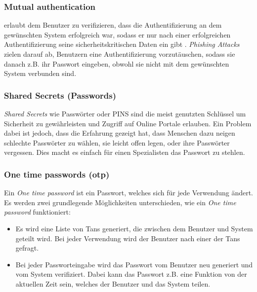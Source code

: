 \subsubsection{Mutual authentication}
erlaubt dem Benutzer zu verifizieren, dass die Authentifizierung an dem gewünschten System erfolgreich war, sodass er nur nach einer erfolgreichen Authentifizierung seine sicherheitskritischen Daten ein gibt . \textit{Phishing Attacks} zielen darauf ab, Benutzern eine Authentifizierung  vorzutäuschen, sodass sie danach z.B. ihr Passwort eingeben, obwohl sie nicht mit dem gewünschten System verbunden sind.


\subsubsection{Shared Secrets (Passwords)}
\textit{Shared Secrets} wie Passwörter oder PINS sind die meist genutzten Schlüssel um Sicherheit zu gewährleisten und Zugriff auf Online Portale erlauben. Ein Problem dabei ist jedoch, dass die Erfahrung gezeigt hat, dass Menschen dazu neigen schlechte Passwörter zu wählen, sie leicht offen legen, oder ihre Passwörter vergessen. Dies macht es einfach für einen Spezialisten das Passwort zu stehlen. 
\subsubsection{One time passwords (otp)}
Ein \textit{One time password} ist ein Passwort, welches sich für jede Verwendung ändert. Es werden zwei grundlegende Möglichkeiten unterschieden, wie ein \textit{One time password} funktioniert:
\begin{itemize}
\item Es wird eine Liste von Tans generiert, die zwischen dem Benutzer und System geteilt wird. Bei jeder Verwendung wird der Benutzer nach einer der Tans gefragt.
\item Bei jeder Passworteingabe wird das Passwort vom Benutzer neu generiert und vom System verifiziert. Dabei kann das Passwort z.B. eine Funktion von der aktuellen Zeit sein, welches der Benutzer und das System teilen.
\end{itemize}
